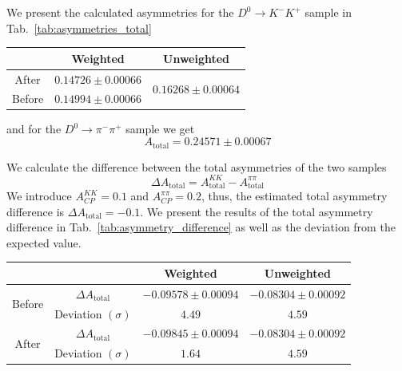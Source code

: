 \documentclass{article}
\begin{document}
        We present the calculated asymmetries for the $D^0\to K^-K^+$ sample in Tab.~\ref{tab:asymmetries_total}
        \begin{center}
                \begin{tabular}{c|c|c}
                        & Weighted & Unweighted\\
                        \hline\hline
                        After & $0.14726 \pm 0.00066$ & \multirow{2}{*}{$0.16268 \pm 0.00064$}\\
                        \cline{1-2}
                        Before & $0.14994 \pm 0.00066$ & \\
                \end{tabular}
                \label{tab:asymmetries_total}
        \end{center}
        and for the $D^0\to \pi^-\pi^+$ sample we get
        \begin{equation}
                A_\text{total} = 0.24571 \pm 0.00067
        \end{equation} 

        We calculate the difference between the total asymmetries of the two samples
        \begin{equation}
                \Delta A_\text{total} = A_\text{total}^{KK} - A_\text{total}^{\pi\pi}
        \end{equation}
        We introduce $A_{CP}^{KK} = 0.1$ and $A_{CP}^{\pi\pi} = 0.2$, thus, the estimated total asymmetry difference is $\Delta A_\text{total} = -0.1$.
        We present the results of the total asymmetry difference in Tab.~\ref{tab:asymmetry_difference} as well as the deviation from the expected value.
        \begin{center}
                \begin{tabular}{c|c|c|c}
                        & & Weighted & Unweighted\\
                        \hline\hline
                        \multirow{2}{*}{Before} & $\Delta A_\text{total}$ & $-0.09578 \pm 0.00094$ & $-0.08304 \pm 0.00092$\\
                        & Deviation $(\sigma)$ & $4.49$ & $4.59$\\
                        \hline
                        \multirow{2}{*}{After} & $\Delta A_\text{total}$ & $-0.09845 \pm 0.00094$ & $-0.08304 \pm 0.00092$\\
                        & Deviation $(\sigma)$ & $1.64$ & $4.59$\\
                \end{tabular}
                \label{tab:asymmetry_difference}
        \end{center}
\end{document}

